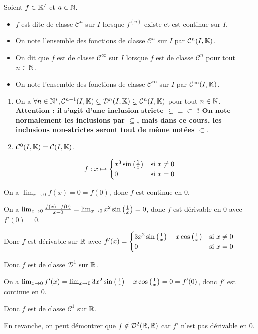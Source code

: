 \documentclass[12pt, a4paper]{report}
\begin{document}
\begin{definition}
  Soient $f \in \mathbb{K}^I$ et $a\in\mathbb{N}$.
  \begin{itemize}
    \item $f$ est dite de classe $\mathcal{C}^n$ sur $I$ lorsque $f^{(n)}$ existe et est continue sur $I$.
    \item On note l'ensemble des fonctions de classe $\mathcal{C}^n$ sur $I$ par $\mathcal{C}^n(I,\mathbb{K})$.
    \item On dit que $f$ est de classe $\mathcal{C}^{\infty}$ sur $I$ lorsque $f$ est de classe $\mathcal{C}^n$ pour tout $n \in \mathbb{N}$.
    \item On note l'ensemble des fonctions de classe $\mathcal{C}^{\infty}$ sur $I$ par $\mathcal{C}^{\infty}(I,\mathbb{K})$.
  \end{itemize}
\end{definition}

\begin{remark}
  \begin{enumerate}
    \item On a $\forall n \in \mathbb{N}^*, \mathcal{C}^{n-1}(I,\mathbb{K}) \subsetneq \mathcal{D}^n(I,\mathbb{K}) \subsetneq \mathcal{C}^n(I,\mathbb{K})$ pour tout $n \in \mathbb{N}$.\\\textbf{Attention : il s'agit d'une inclusion stricte $\subsetneq \equiv \subset$ ! On note normalement les inclusions par $\subseteq$, mais dans ce cours, les inclusions non-strictes seront tout de même notées $\subset$}.
    \item $\mathcal{C}^0(I,\mathbb{K}) = \mathcal{C}(I,\mathbb{K})$.
  \end{enumerate}
\end{remark}

\begin{example}
  $$f:x\mapsto \begin{cases}
  x^3\sin\left(\frac1x\right) & \text{si } x \neq 0\\
  0 & \text{si } x = 0
  \end{cases}$$

  On a $\lim_{x \to 0} f(x) = 0 = f(0)$, donc $f$ est continue en $0$.

  On a $\lim_{x \to 0} \frac{f(x) - f(0)}{x - 0} = \lim_{x \to 0} x^2 \sin\left(\frac1x\right) = 0$, donc $f$ est dérivable en $0$ avec $f'(0) = 0$.

  Donc $f$ est dérivable sur $\mathbb{R}$ avec $f'(x) = \begin{cases}
  3x^2\sin\left(\frac1x\right) - x\cos\left(\frac1x\right) & \text{si } x \neq 0\\0 & \text{si } x = 0\end{cases}$

  Donc $f$ est de classe $\mathcal{D}^1$ sur $\mathbb{R}$.

  On a $\lim_{x \to 0} f'(x) = \lim_{x \to 0} 3x^2\sin\left(\frac1x\right) - x\cos\left(\frac1x\right) = 0 = f'(0)$, donc $f'$ est continue en $0$.

  Donc $f$ est de classe $\mathcal{C}^1$ sur $\mathbb{R}$.

  En revanche, on peut démontrer que $f \notin \mathcal{D}^2(\mathbb{R},\mathbb{R})$ car $f'$ n'est pas dérivable en $0$.
\end{example}
\end{document}
